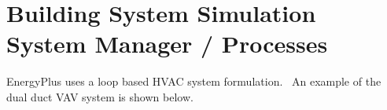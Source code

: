 \chapter{Building System Simulation System Manager / Processes}\label{building-system-simulation-system-manager-processes}

EnergyPlus uses a loop based HVAC system formulation.~ An example of the dual duct VAV system is shown below.
